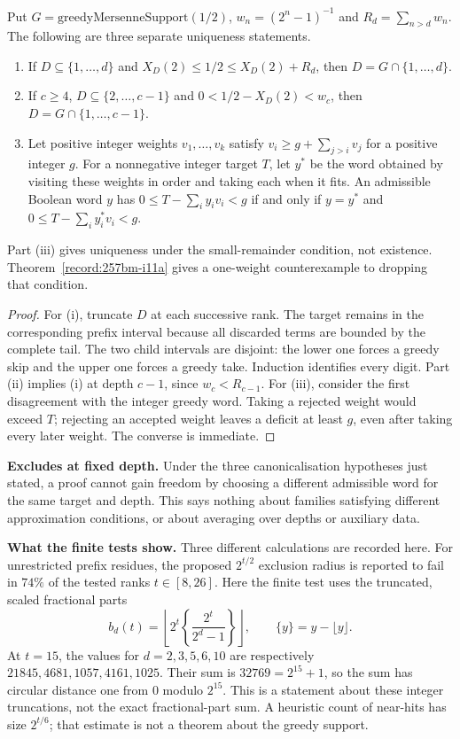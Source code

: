 \begin{prop}
\label{prop:canon}
Put $G=\mathrm{greedyMersenneSupport}(1/2)$,
$w_n=(2^n-1)^{-1}$ and $R_d=\sum_{n>d}w_n$.
The following are three separate uniqueness statements.
\begin{enumerate}[nosep,label=(\roman*)]
\item If $D\subseteq\{1,\ldots,d\}$ and
$X_D(2)\le1/2\le X_D(2)+R_d$, then $D=G\cap\{1,\ldots,d\}$.
\item If $c\ge4$, $D\subseteq\{2,\ldots,c-1\}$ and
$0<1/2-X_D(2)<w_c$, then $D=G\cap\{1,\ldots,c-1\}$.
\item Let positive integer weights $v_1,\ldots,v_k$ satisfy
$v_i\ge g+\sum_{j>i}v_j$ for a positive integer $g$.
For a nonnegative integer target $T$, let $y^*$ be the word obtained by
visiting these weights in order and taking each when it fits.
An admissible Boolean word $y$ has
$0\le T-\sum_i y_iv_i<g$ if and only if $y=y^*$ and
$0\le T-\sum_i y_i^*v_i<g$.
\end{enumerate}
Part (iii) gives uniqueness under the small-remainder condition,
not existence.  Theorem~\ref{record:257bm-i11a} gives a
one-weight counterexample to dropping that condition.
\end{prop}
\begin{proof}
For (i), truncate $D$ at each successive rank.  The target remains
in the corresponding prefix interval because all discarded terms
are bounded by the complete tail.  The two child intervals are
disjoint: the lower one forces a greedy skip and the upper one
forces a greedy take.  Induction identifies every digit.
Part (ii) implies (i) at depth $c-1$, since $w_c<R_{c-1}$.
For (iii), consider the first disagreement with the integer greedy
word.  Taking a rejected weight would exceed $T$; rejecting an accepted
weight leaves a deficit at least $g$, even after taking every later
weight.  The converse is immediate.
\end{proof}

\textbf{Excludes at fixed depth.} Under the three canonicalisation
hypotheses just stated, a proof cannot gain freedom by choosing a different
admissible word for the same target and depth.  This says nothing about
families satisfying different approximation conditions, or about averaging
over depths or auxiliary data.

\textbf{What the finite tests show.} Three different calculations are
recorded here.  For unrestricted prefix residues, the proposed
$2^{t/2}$ exclusion radius is reported to fail in $74\%$ of the tested
ranks $t\in[8,26]$.  Here the finite test uses the truncated,
scaled fractional parts
\[
 b_d(t)=\left\lfloor 2^t\left\{\frac{2^t}{2^d-1}\right\}\right\rfloor,
 \qquad \{y\}=y-\lfloor y\rfloor.
\]
At $t=15$, the values for $d=2,3,5,6,10$ are respectively
$21845,4681,1057,4161,1025$.  Their sum is $32769=2^{15}+1$,
so the sum has circular distance one from $0$ modulo $2^{15}$.
This is a statement about these integer truncations, not the exact
fractional-part sum.  A heuristic count of near-hits has
size $2^{t/6}$; that estimate is not a theorem about the greedy support.

